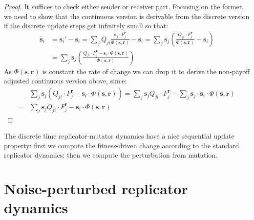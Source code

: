 \documentclass[fleqn,reqno,10pt]{article}
\renewcommand{\Smixed}{\ensuremath{\mathrm{\mathbf{s}}}}
\renewcommand{\Rmixed}{\ensuremath{\mathrm{\mathbf{r}}}}
\begin{document}
\begin{proof}
  It suffices to check either sender or receiver part. Focusing on the
  former, we need to show that the continuous version is derivable
  from the discrete version if the discrete update steps get
  infinitely small so that:
  \begin{align*}
    \dot{\Smixed_i} & = \Smixed_i' - \Smixed_i = \sum_{j} Q_{ji}
    \frac{\Smixed_j \cdot F_j^{\Rmixed}}{ \Phi(\Smixed,\Rmixed)} -
    \Smixed_i = \sum_{j} \Smixed_j \left ( \frac{ Q_{ji} \cdot
        F_j^{\Rmixed}}{ \Phi(\Smixed,\Rmixed)} - \Smixed_i \right ) \\
    & = \sum_{j} \Smixed_j \left ( \frac{ Q_{ji} \cdot
        F_j^{\Rmixed} - \Smixed_i \cdot \Phi(\Smixed,\Rmixed)}{ \Phi(\Smixed,\Rmixed)}  \right )
  \end{align*}
  As $\Phi(\Smixed,\Rmixed)$ is constant the rate of change we can
  drop it to derive the non-payoff adjusted continuous version above,
  since:
  \begin{align*}
    & \sum_{j} \Smixed_j \left ( Q_{ji} \cdot
        F_j^{\Rmixed} - \Smixed_i \cdot \Phi(\Smixed,\Rmixed)  \right
      ) =     \sum_{j} \Smixed_j  Q_{ji} \cdot
        F_j^{\Rmixed} - \sum_{j} \Smixed_j \cdot \Smixed_i \cdot
        \Phi(\Smixed,\Rmixed) \\
       = &    \sum_{j} \Smixed_j  Q_{ji} \cdot
        F_j^{\Rmixed} - \Smixed_i \cdot
        \Phi(\Smixed,\Rmixed) 
  \end{align*}
\end{proof}

The discrete time replicator-mutator dynamics have a nice sequential
update property: first we compute the fitness-driven change according
to the standard replicator dynamics; then we compute the perturbation
from mutation.

\section{Noise-perturbed replicator dynamics}
\end{document}
